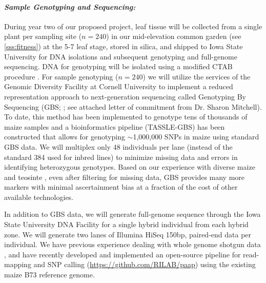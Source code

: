 

\paragraph{\emph{Sample Genotyping and Sequencing:}}
During year two of our proposed project, leaf tissue will be collected from a single plant per sampling site ($n=240$) in our mid-elevation common garden (see \ref{sss:fitness}) at the 5-7 leaf stage, stored in silica, and shipped to Iowa State University for DNA isolations and subsequent genotyping and full-genome sequencing.
DNA for genotyping will be isolated using a modified CTAB procedure \citep{Saghai-Maroof1984}.  For sample genotyping ($n=240$) we will utilize the services of the Genomic Diversity Facility at Cornell University to implement a reduced representation approach to next-generation sequencing called Genotyping By Sequencing (GBS; \citealt{Elshire2011}; see attached letter of commitment from Dr. Sharon Mitchell). To date, this method has been implemented to genotype tens of thousands of maize samples and a bioinformatics pipeline (TASSLE-GBS) has been constructed that allows for genotyping $\sim$1,000,000 SNPs in maize \citep{Glaubitz2014} using standard GBS data. 
We will multiplex only 48 individuals per lane (instead of the standard 384 used for inbred lines) to minimize missing data and errors in identifying heterozygous genotypes. 
Based on our experience with diverse maize and teosinte \citep[e.g.][]{Takuno15062015, mezmouk2014pattern}, even after filtering for missing data, GBS provides many more markers with minimal ascertainment bias at a fraction of the cost of other available technologies. 

In addition to GBS data, we will generate full-genome sequence through the Iowa State University DNA Facility for a single hybrid individual from each hybrid zone.  We will generate two lanes of Illumina HiSeq 150bp, paired-end data per individual.  
We have previous experience dealing with whole genome shotgun data \citep{Gore2009, Chia2012a,  Hufford2012b, da2015origin}, and have recently developed and implemented an open-source pipeline for read-mapping and SNP calling (\url{https://github.com/RILAB/paap}) using the existing maize B73 reference genome. 

